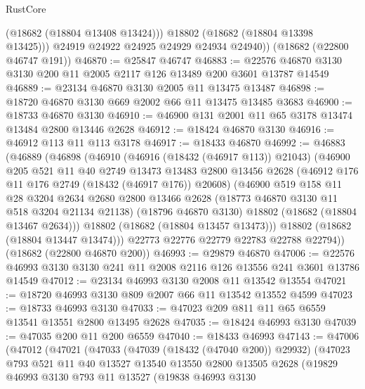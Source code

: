 \begin{lexlean}{RustCore}
\begin{coremodule}
            (@18682 (@18804 @13408 @13424)))
          @18802
          (@18682 (@18804 @13398 @13425)))
        @24919
        @24922
        @24925
        @24929
        @24934
        @24940))
    (@18682 (@22800 @46747 @191))
@46870 := @25847 @46747
@46883 := @22576 @46870 @3130 @3130 @200 @11 @2005 @2117 @126 @13489 @200 @3601 @13787 @14549
@46889 := @23134 @46870 @3130 @2005 @11 @13475 @13487
@46898 := @18720 @46870 @3130 @669 @2002 @66 @11 @13475 @13485 @3683
@46900 := @18733 @46870 @3130
@46910 := @46900 @131 @2001 @11 @65 @3178 @13474 @13484 @2800 @13446 @2628
@46912 := @18424 @46870 @3130
@46916 := @46912 @113 @11 @113 @3178
@46917 := @18433 @46870
@46992 := @46883
    (@46889
      (@46898
        (@46910
          (@46916 (@18432 (@46917 @113)) @21043)
          (@46900
            @205
            @521
            @11
            @40
            @2749
            @13473
            @13483
            @2800
            @13456
            @2628
            (@46912 @176 @11 @176 @2749 (@18432 (@46917 @176)) @20608)
            (@46900
              @519
              @158
              @11
              @28
              @3204
              @2634
              @2680
              @2800
              @13466
              @2628
              (@18773 @46870 @3130 @11 @518 @3204 @21134 @21138)
              (@18796 @46870 @3130)
              @18802
              (@18682 (@18804 @13467 @2634)))
            @18802
            (@18682 (@18804 @13457 @13473)))
          @18802
          (@18682 (@18804 @13447 @13474)))
        @22773
        @22776
        @22779
        @22783
        @22788
        @22794))
    (@18682 (@22800 @46870 @200))
@46993 := @29879 @46870
@47006 := @22576 @46993 @3130 @3130 @241 @11 @2008 @2116 @126 @13556 @241 @3601 @13786 @14549
@47012 := @23134 @46993 @3130 @2008 @11 @13542 @13554
@47021 := @18720 @46993 @3130 @809 @2007 @66 @11 @13542 @13552 @4599
@47023 := @18733 @46993 @3130
@47033 := @47023 @209 @811 @11 @65 @6559 @13541 @13551 @2800 @13495 @2628
@47035 := @18424 @46993 @3130
@47039 := @47035 @200 @11 @200 @6559
@47040 := @18433 @46993
@47143 := @47006
    (@47012
      (@47021
        (@47033
          (@47039 (@18432 (@47040 @200)) @29932)
          (@47023
            @793
            @521
            @11
            @40
            @13527
            @13540
            @13550
            @2800
            @13505
            @2628
            (@19829
              @46993
              @3130
              @793
              @11
              @13527
              (@19838
                @46993
                @3130

\end{coremodule}
\end{lexlean}
